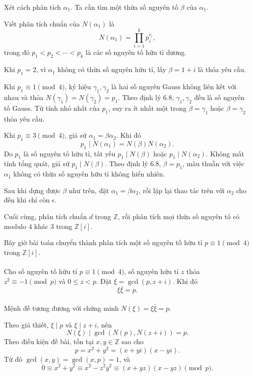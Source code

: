 \documentclass[11pt]{article}
\begin{document}
Xét cách phân tích \(\alpha_1\). Ta cần tìm một thừa số nguyên tố \(\beta\)
của \(\alpha_1\).

Viết phân tích chuẩn của \(N(\alpha_1)\) là
\[
  N(\alpha_1)=\prod_{i=1}^k p_i^{r_i},
\]
trong đó \(p_1<p_2<\cdots<p_k\) là các số nguyên tố hữu tỉ dương.

Khi \(p_1=2\), vì \(\alpha_1\) không có thừa số nguyên hữu tỉ, lấy
\(\beta=1+i\) là thỏa yêu cầu.

Khi \(p_1\equiv1\pmod4\), ký hiệu \(\gamma_1,\gamma_2\) là hai số nguyên
Gauss không liên kết với nhau và thỏa \(N(\gamma_1)=N(\gamma_2)=p_1\). Theo
định lý 6.8, \(\gamma_1,\gamma_2\) đều là số nguyên tố Gauss. Từ tính nhỏ
nhất của \(p_1\), suy ra ít nhất một trong \(\beta=\gamma_1\) hoặc
\(\beta=\gamma_2\) thỏa yêu cầu.

Khi \(p_1\equiv3\pmod4\), giả sử \(\alpha_1=\beta\alpha_2\). Khi đó
\[
  p_1\mid N(\alpha_1)=N(\beta)N(\alpha_2).
\]
Do \(p_1\) là số nguyên tố hữu tỉ, tất yếu \(p_1\mid N(\beta)\) hoặc
\(p_1\mid N(\alpha_2)\). Không mất tính tổng quát, giả sử
\(p_1\mid N(\beta)\). Theo định lý 6.8, \(\beta=p_1\), mâu thuẫn với việc
\(\alpha_1\) không có thừa số nguyên hữu tỉ không hiển nhiên.

Sau khi dựng được \(\beta\) như trên, đặt \(\alpha_1=\beta\alpha_2\), rồi lặp
lại thao tác trên với \(\alpha_2\) cho đến khi chỉ còn \(\epsilon\).

Cuối cùng, phân tích chuẩn \(d\) trong \(\mathbb Z\), rồi phân tích mọi thừa
số nguyên tố có modulo \(4\) khác \(3\) trong \(\mathbb Z[i]\).

Bây giờ bài toán chuyển thành phân tích một số nguyên tố hữu tỉ
\(p\equiv1\pmod4\) trong \(\mathbb Z[i]\).

\paragraph{}
Cho số nguyên tố hữu tỉ \(p\equiv1\pmod4\), số nguyên hữu tỉ \(z\) thỏa
\(z^2\equiv-1\pmod p\) và \(0\le z<p\). Đặt \(\xi=\gcd(p,z+i)\). Khi đó
\[
  \xi\bar\xi=p.
\]

\paragraph{}
Mệnh đề tương đương với chứng minh \(N(\xi)=\xi\bar\xi=p\).

Theo giả thiết, \(\xi\mid p\) và \(\xi\mid z+i\), nên
\[
  N(\xi)\mid \gcd(N(p),N(z+i))=p.
\]
Theo điều kiện đề bài, tồn tại \(x,y\in\mathbb Z\) sao cho
\[
  p=x^2+y^2=(x+yi)(x-yi).
\]
Từ đó \(\gcd(x,y)=\gcd(x,p)=1\), và
\[
  0\equiv x^2+y^2\equiv x^2-z^2y^2
    \equiv (x+yz)(x-yz)\pmod p.
\]
\end{document}
